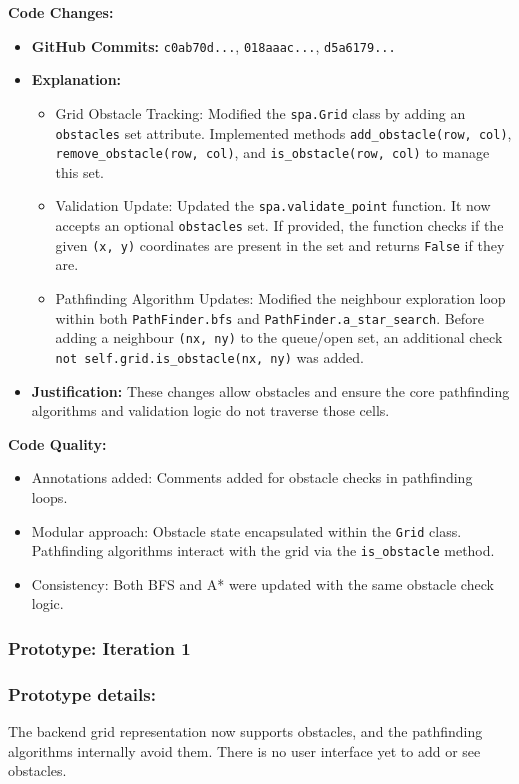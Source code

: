 \textbf{Code Changes:}
\begin{itemize}
	\item \textbf{GitHub Commits:} \verb|c0ab70d...|, \verb|018aaac...|, \verb|d5a6179...|
	\item \textbf{Explanation:}
	\begin{itemize}
	    \item Grid Obstacle Tracking: Modified the \verb|spa.Grid| class by adding an \verb|obstacles| set attribute. Implemented methods \verb|add_obstacle(row, col)|, \verb|remove_obstacle(row, col)|, and \verb|is_obstacle(row, col)| to manage this set.
	    \item Validation Update: Updated the \verb|spa.validate_point| function. It now accepts an optional \verb|obstacles| set. If provided, the function checks if the given \verb|(x, y)| coordinates are present in the set and returns \verb|False| if they are.
		\item Pathfinding Algorithm Updates: Modified the neighbour exploration loop within both \verb|PathFinder.bfs| and \verb|PathFinder.a_star_search|. Before adding a neighbour \verb|(nx, ny)| to the queue/open set, an additional check \verb|not self.grid.is_obstacle(nx, ny)| was added.
	\end{itemize}
	\item \textbf{Justification:} These changes allow obstacles and ensure the core pathfinding algorithms and validation logic do not traverse those cells.
\end{itemize}

\textbf{Code Quality:}
\begin{itemize}
	\item Annotations added: Comments added for obstacle checks in pathfinding loops.
	\item Modular approach: Obstacle state encapsulated within the \verb|Grid| class. Pathfinding algorithms interact with the grid via the \verb|is_obstacle| method.
	\item Consistency: Both BFS and A* were updated with the same obstacle check logic.
\end{itemize}

\subsubsection*{Prototype: Iteration 1}




\newpage
\subsubsection{Prototype details:}
The backend grid representation now supports obstacles, and the pathfinding algorithms internally avoid them. There is no user interface yet to add or see obstacles.

